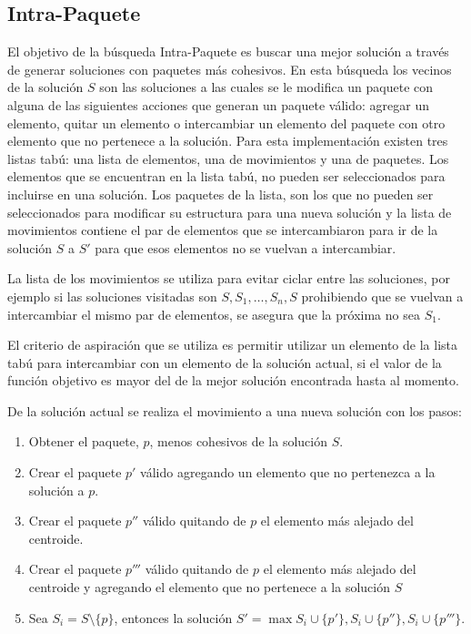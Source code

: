 \subsection{Intra-Paquete}
El objetivo de la búsqueda Intra-Paquete es buscar una mejor solución a través de generar soluciones con paquetes más cohesivos. En esta búsqueda los vecinos de la solución $S$ son las soluciones a las cuales se le modifica un paquete con alguna de las siguientes acciones que generan un paquete válido: agregar un elemento, quitar un elemento o intercambiar un elemento del paquete con otro elemento que no pertenece a la solución. Para esta implementación existen tres listas tabú: una lista de elementos, una de movimientos y una de paquetes. Los elementos que se encuentran en la lista tabú, no pueden ser seleccionados para incluirse en una solución. Los paquetes de la lista, son los que no pueden ser seleccionados para modificar su estructura para una nueva solución y la lista de movimientos contiene el par de elementos que se intercambiaron para ir de la solución $S$ a $S'$ para que esos elementos no se vuelvan a intercambiar.

La lista de los movimientos se utiliza para evitar ciclar entre las soluciones, por ejemplo si las soluciones visitadas son $S, S_1, \ldots, S_n, S$ prohibiendo que se vuelvan a intercambiar el mismo par de elementos, se asegura que la próxima no sea $S_1$.

El criterio de aspiración que se utiliza es permitir utilizar un elemento de la lista tabú para intercambiar con un elemento de la solución actual, si el valor de la función objetivo es mayor del de la mejor solución encontrada hasta al momento.

De la solución actual se realiza el movimiento a una nueva solución con los pasos:
\begin{enumerate}
	\item Obtener el paquete, $p$, menos cohesivos de la solución $S$.
	\item Crear el paquete $p'$ válido agregando un elemento que no pertenezca a la solución a $p$.
	\item Crear el paquete $p''$ válido quitando de $p$ el elemento más alejado del centroide.
	\item Crear el paquete $p'''$ válido quitando de $p$ el elemento más alejado del centroide y agregando el elemento que no pertenece a la solución $S$
	\item Sea $S_{i} = S\setminus \{p\}$, entonces la solución $S' = \max{S_{i}\cup\{p'\}, S_{i}\cup\{p''\}, S_{i}\cup\{p'''\}}$.
\end{enumerate}

